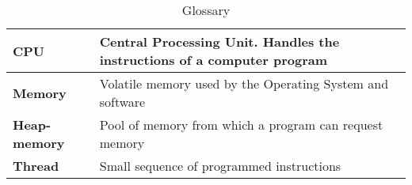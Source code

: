 \begin{longtable}{|m{4cm}|l|l|} 
\caption[]{Glossary} 
\hline 
\cellcolor[HTML]{C0C0C0}\textbf{CPU} & \multicolumn{2}{p{13cm}|}{Central Processing Unit. Handles the instructions of a computer program}\\ \hline 
\cellcolor[HTML]{C0C0C0}\textbf{Memory} & \multicolumn{2}{p{13cm}|}{Volatile memory used by the Operating System and software}\\ \hline 
\cellcolor[HTML]{C0C0C0}\textbf{Heap-memory} & \multicolumn{2}{p{13cm}|}{Pool of memory from which a program can request memory}\\ \hline 
\cellcolor[HTML]{C0C0C0}\textbf{Thread} & \multicolumn{2}{p{13cm}|}{Small sequence of programmed instructions}\\ \hline 
\end{longtable}


